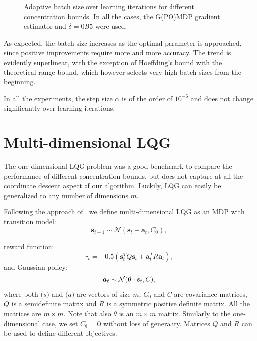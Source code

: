 \begin{figure}[h!]
\begin{adjustbox}{left}
{	\label{fig:6}
	}
\end{adjustbox}
\caption{Adaptive batch size over learning iterations for different concentration bounds. In all the cases, the G(PO)MDP gradient estimator and $\delta=0.95$ were used.}
\label{fig:8}
\end{figure}


As expected, the batch size increases as the optimal parameter is approached, since positive improvements require more and more accuracy. The trend is evidently superlinear, with the exception of Hoeffding's bound with the theoretical range bound, which however selects very high batch sizes from the beginning. 

In all the experiments, the step size $\alpha$ is of the order of $10^{-6}$ and does not change significantly over learning iterations.


\section{Multi-dimensional LQG}
The one-dimensional \ac{LQG} problem was a good benchmark to compare the performance of different concentration bounds, but does not capture at all the coordinate descent aspect of our algorithm. Luckily, \ac{LQG} can easily be generalized to any number of dimensions $m$.

Following the approach of \cite{Pirotta:2015:MRL:2888116.2888124}, we define multi-dimensional \ac{LQG} as an \ac{MDP} with transition model:
\[
	\boldsymbol{s}_{t+1} \sim \mathcal{N}(\boldsymbol{s}_t+\boldsymbol{a}_t,C_0),
\] 

reward function:
\[
	r_t=-0.5(\boldsymbol{s}_t^TQ\boldsymbol{s}_t + \boldsymbol{a}_t^TR\boldsymbol{a}_t),
\]
and Gaussian policy:
\[
	\boldsymbol{a_t} \sim \mathcal{N}(\boldsymbol{\theta} \cdot \boldsymbol{s}_t,C),
\]
where both $\boldsymbol(s)$ and $\boldsymbol(a)$ are vectors of size $m$, $C_0$ and $C$ are covariance matrices, $Q$ is a semidefinite matrix and $R$ is a symmetric positive definite matrix. All the matrices are $m\times m$. Note that also $\theta$ is an $m \times m$ matrix. Similarly to the one-dimensional case, we set $C_0=\boldsymbol{0}$ without loss of generality. Matrices $Q$ and $R$ can be used to define different objectives.

